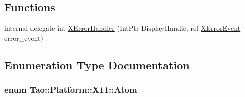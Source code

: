 \subsection*{Functions}
\begin{DoxyCompactItemize}
\item 
internal delegate int \hyperlink{namespace_tao_1_1_platform_1_1_x11_adc48ccf4d536d7ff9472cff2eb366dfe}{XErrorHandler} (IntPtr DisplayHandle, ref \hyperlink{struct_tao_1_1_platform_1_1_x11_1_1_x_error_event}{XErrorEvent} error\_\-event)
\end{DoxyCompactItemize}


\subsection{Enumeration Type Documentation}
\hypertarget{namespace_tao_1_1_platform_1_1_x11_a9042a68c2a3fd29002b5ad9d26f5776a}{
\subsubsection[{Atom}]{\setlength{\rightskip}{0pt plus 5cm}enum {\bf Tao::Platform::X11::Atom}}}
\label{namespace_tao_1_1_platform_1_1_x11_a9042a68c2a3fd29002b5ad9d26f5776a}
